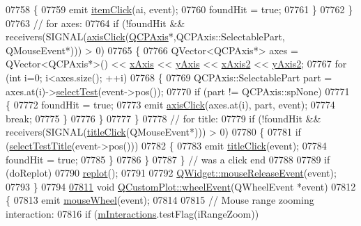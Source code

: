 \begin{DoxyCode}
07758       \{
07759         emit \hyperlink{a00116_ae16b51f52d2b7aebbc7e3e74e6ff2e4b}{itemClick}(ai, event);
07760         foundHit = \textcolor{keyword}{true};
07761       \}
07762     \}
07763     \textcolor{comment}{// for axes:}
07764     \textcolor{keywordflow}{if} (!foundHit && receivers(SIGNAL(\hyperlink{a00116_abf635f8b56ab5c16d5de9f358543e82b}{axisClick}(\hyperlink{a00025}{QCPAxis}*,QCPAxis::SelectablePart,
      QMouseEvent*))) > 0)
07765     \{
07766       QVector<QCPAxis*> axes = QVector<QCPAxis*>() << \hyperlink{a00116_a384438707adbcc96b0fa1324106f7129}{xAxis} << \hyperlink{a00116_af168096ce67002b1fbce18ae5dd1b652}{yAxis} << 
      \hyperlink{a00116_a058f6d3a4c86bf94c476e5c380711dba}{xAxis2} << \hyperlink{a00116_a4fd6679232da7da0a1ae4e1b6ae83d6e}{yAxis2};
07767       \textcolor{keywordflow}{for} (\textcolor{keywordtype}{int} i=0; i<axes.size(); ++i)
07768       \{
07769         QCPAxis::SelectablePart part = axes.at(i)->\hyperlink{a00025_a940be5ef61f4fa0dc21e4f4c7a5875c2}{selectTest}(event->pos());
07770         \textcolor{keywordflow}{if} (part != QCPAxis::spNone)
07771         \{
07772           foundHit = \textcolor{keyword}{true};
07773           emit \hyperlink{a00116_abf635f8b56ab5c16d5de9f358543e82b}{axisClick}(axes.at(i), part, event);
07774           \textcolor{keywordflow}{break};
07775         \}
07776       \}
07777     \}
07778     \textcolor{comment}{// for title:}
07779     \textcolor{keywordflow}{if} (!foundHit && receivers(SIGNAL(\hyperlink{a00116_a969beb5e4b7e8864e5e349fcda4ce45b}{titleClick}(QMouseEvent*))) > 0)
07780     \{
07781       \textcolor{keywordflow}{if} (\hyperlink{a00116_a2a2d01a092840ac01b16104f7973f831}{selectTestTitle}(event->pos()))
07782       \{
07783         emit \hyperlink{a00116_a969beb5e4b7e8864e5e349fcda4ce45b}{titleClick}(event);
07784         foundHit = \textcolor{keyword}{true};
07785       \}
07786     \}
07787   \} \textcolor{comment}{// was a click end}
07788   
07789   \textcolor{keywordflow}{if} (doReplot)
07790     \hyperlink{a00116_a563540b54b2a09c8ef092d42e9621f42}{replot}();
07791   
07792   \hyperlink{a00116_a724e97d2e8c03e68adac5f4b6164a1b3}{QWidget::mouseReleaseEvent}(event);
07793 \}
07794 
\hypertarget{a00115_source_l07811}{}\hyperlink{a00116_a7b8bd7e8d3a1d23a8595e9c6a6b76ef1}{07811} \textcolor{keywordtype}{void} \hyperlink{a00116_a7b8bd7e8d3a1d23a8595e9c6a6b76ef1}{QCustomPlot::wheelEvent}(QWheelEvent *event)
07812 \{
07813   emit \hyperlink{a00116_ac80a14206f99304a91d2aa55775ec3ff}{mouseWheel}(event);
07814   
07815   \textcolor{comment}{// Mouse range zooming interaction:}
07816   \textcolor{keywordflow}{if} (\hyperlink{a00116_af8d040767753acc548b2368dd4150ae6}{mInteractions}.testFlag(iRangeZoom))

\end{DoxyCode}
